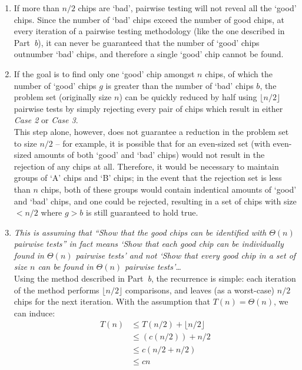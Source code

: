 \documentclass{article}
\begin{document}
\begin{enumerate}
\begin{enumerate}
\item If more than $n/2$ chips are `bad', pairwise testing will not reveal all the `good' chips. Since the number of `bad' chips exceed the number of good chips, at every iteration of a pairwise testing methodology (like the one described in Part~\emph{b}), it can never be guaranteed that the number of `good' chips outnumber `bad' chips, and therefore a single `good' chip cannot be found.
\item If the goal is to find only one `good' chip amongst $n$ chips, of which the number of `good' chips $g$ is greater than the number of `bad' chips $b$, the problem set (originally size $n$) can be quickly reduced by half using $\lfloor n/2 \rfloor$ pairwise tests by simply rejecting every pair of chips which result in either \emph{Case 2} or \emph{Case 3}. 
\\
This step alone, however, does not guarantee a reduction in the problem set to size $n/2$ -- for example, it is possible that for an even-sized set (with even-sized amounts of both `good' and `bad' chips) would not result in the rejection of any chips at all. Therefore, it would be necessary to maintain groups of `A' chips and `B' chips; in the event that the rejection set is less than $n$ chips, both of these groups would contain indentical amounts of `good' and `bad' chips, and one could be rejected, resulting in a set of chips with size $< n/2$ where $g > b$ is still guaranteed to hold true.
\item \emph{This is assuming that ``Show that the good chips can be identified with $\Theta(n)$ pairwise tests'' in fact means `Show that each good chip can be individually found in $\Theta(n)$ pairwise tests' and not `Show that every good chip in a set of size $n$ can be found in $\Theta(n)$ pairwise tests'\dots} 
\\
Using the method described in Part~\emph{b}, the recurrence is simple: each iteration of the method performs $\lfloor n/2 \rfloor$ comparisons, and leaves (as a worst-case) $n/2$ chips for the next iteration. With the assumption that $T(n) = \Theta(n)$, we can induce:
\begin{align*}
T(n) &\leq T(n/2) + \lfloor n/2 \rfloor \\
& \leq (c(n/2))+n/2 \\
& \leq c(n/2 + n/2) \\
& \leq cn
\end{align*}
\end{enumerate}
\end{enumerate}
\end{document}
